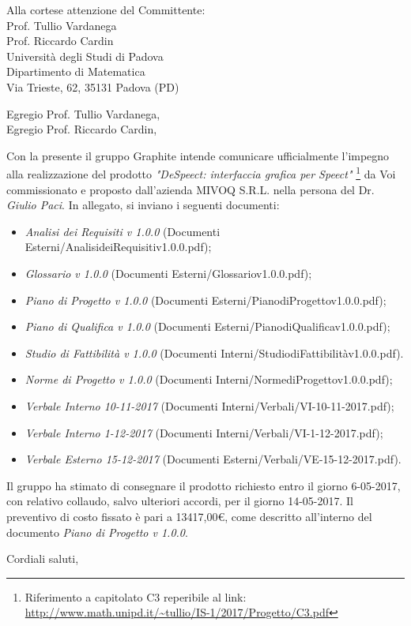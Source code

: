 \documentclass[]{letter}
\begin{document}
\begin{letter}{
		Alla cortese attenzione del Committente: \\
		Prof. Tullio Vardanega \\
		Prof. Riccardo Cardin \\
		Università degli Studi di Padova \\
		Dipartimento di Matematica \\ 
		Via Trieste, 62, 35131 Padova (PD)
	}

\opening{Egregio Prof. Tullio Vardanega, \\ Egregio Prof. Riccardo Cardin,}

Con la presente il gruppo Graphite intende comunicare ufficialmente l’impegno alla realizzazione del prodotto  \textit{"DeSpeect: interfaccia grafica per Speect"} \footnote{Riferimento a capitolato C3 reperibile al link: \url{http://www.math.unipd.it/~tullio/IS-1/2017/Progetto/C3.pdf}} da Voi commissionato e proposto dall'azienda MIVOQ S.R.L. nella persona del Dr. \textit{Giulio Paci}.  In  allegato,  si inviano i seguenti documenti:

\begin{itemize}
	\item \textit{Analisi dei Requisiti v 1.0.0} (Documenti Esterni/AnalisideiRequisitiv1.0.0.pdf);
	\item \textit{Glossario v 1.0.0} (Documenti Esterni/Glossariov1.0.0.pdf);
	\item \textit{Piano di Progetto v 1.0.0} (Documenti Esterni/PianodiProgettov1.0.0.pdf);
	\item \textit{Piano di Qualifica v 1.0.0} (Documenti Esterni/PianodiQualificav1.0.0.pdf);
	\item \textit{Studio di Fattibilità v 1.0.0} (Documenti Interni/StudiodiFattibilitàv1.0.0.pdf).
	\item \textit{Norme di Progetto v 1.0.0} (Documenti Interni/NormediProgettov1.0.0.pdf);
	\item \textit{Verbale Interno 10-11-2017} (Documenti Interni/Verbali/VI-10-11-2017.pdf);
	\item \textit{Verbale Interno 1-12-2017} (Documenti Interni/Verbali/VI-1-12-2017.pdf);
	\item \textit{Verbale Esterno 15-12-2017} (Documenti Esterni/Verbali/VE-15-12-2017.pdf).
\end{itemize}

Il gruppo ha stimato di consegnare il prodotto richiesto entro il giorno 6-05-2017, con relativo collaudo, salvo ulteriori accordi, per il giorno 14-05-2017. Il preventivo di costo fissato è pari a 13417,00\euro, come descritto all’interno del documento \textit{Piano di Progetto v 1.0.0}.

\signature{Responsabile di Progetto \\ Graphite}

\closing{Cordiali saluti,}


\end{letter}
\end{document}
